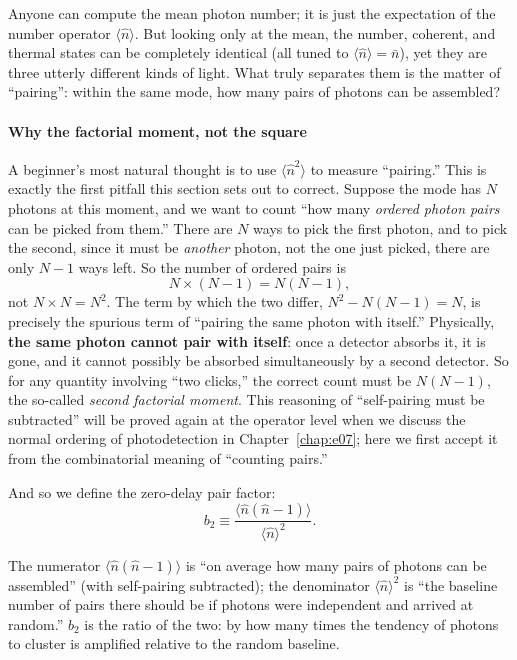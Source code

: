 Anyone can compute the mean photon number; it is just the expectation of the number operator \(\langle\hat n\rangle\). But looking only at the mean, the number, coherent, and thermal states can be completely identical (all tuned to \(\langle\hat n\rangle=\bar n\)), yet they are three utterly different kinds of light. What truly separates them is the matter of ``pairing'': within the same mode, how many pairs of photons can be assembled?

\paragraph{Why the factorial moment, not the square}
\label{sec:e06-why-factorial}

A beginner's most natural thought is to use \(\langle\hat n^2\rangle\) to measure ``pairing.'' This is exactly the first pitfall this section sets out to correct. Suppose the mode has \(N\) photons at this moment, and we want to count ``how many \emph{ordered photon pairs} can be picked from them.'' There are \(N\) ways to pick the first photon, and to pick the second, since it must be \emph{another} photon, not the one just picked, there are only \(N-1\) ways left. So the number of ordered pairs is
\[
  N\times(N-1)=N(N-1),
\]
not \(N\times N=N^2\). The term by which the two differ, \(N^2-N(N-1)=N\), is precisely the spurious term of ``pairing the same photon with itself.'' Physically, \textbf{the same photon cannot pair with itself}: once a detector absorbs it, it is gone, and it cannot possibly be absorbed simultaneously by a second detector. So for any quantity involving ``two clicks,'' the correct count must be \(N(N-1)\), the so-called \emph{second factorial moment}. This reasoning of ``self-pairing must be subtracted'' will be proved again at the operator level when we discuss the normal ordering of photodetection in Chapter~\ref{chap:e07}; here we first accept it from the combinatorial meaning of ``counting pairs.''

And so we define the zero-delay pair factor:
\begin{equation}
  b_2\equiv\frac{\langle\hat n(\hat n-1)\rangle}{\langle\hat n\rangle^{2}} .
  \label{eq:e06-b2def}
\end{equation}
\begin{formulaexplain}
The numerator \(\langle\hat n(\hat n-1)\rangle\) is ``on average how many pairs of photons can be assembled'' (with self-pairing subtracted); the denominator \(\langle\hat n\rangle^2\) is ``the baseline number of pairs there should be if photons were independent and arrived at random.'' \(b_2\) is the ratio of the two: by how many times the tendency of photons to cluster is amplified relative to the random baseline.
\end{formulaexplain}

